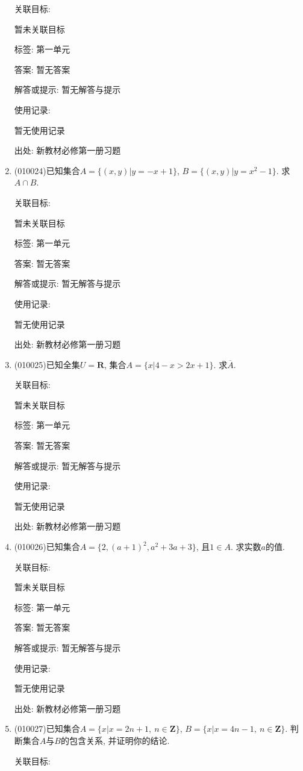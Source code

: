 \documentclass[10pt,a4paper]{article}
\begin{document}
\begin{enumerate}[1.]
关联目标:

暂未关联目标



标签: 第一单元

答案: 暂无答案

解答或提示: 暂无解答与提示

使用记录:

暂无使用记录


出处: 新教材必修第一册习题
\item { (010024)}已知集合$A=\{(x, y)|y=-x+1\}$, $B=\{(x, y)|y=x^2-1\}$. 求$A\cap B$.


关联目标:

暂未关联目标



标签: 第一单元

答案: 暂无答案

解答或提示: 暂无解答与提示

使用记录:

暂无使用记录


出处: 新教材必修第一册习题
\item { (010025)}已知全集$U=\mathbf{R}$, 集合$A=\{x|4-x>2x+1\}$. 求$\overline A$.


关联目标:

暂未关联目标



标签: 第一单元

答案: 暂无答案

解答或提示: 暂无解答与提示

使用记录:

暂无使用记录


出处: 新教材必修第一册习题
\item { (010026)}已知集合$A=\{2, (a+1)^2, a^2+3a+3\}$, 且$1\in A$. 求实数$a$的值.


关联目标:

暂未关联目标



标签: 第一单元

答案: 暂无答案

解答或提示: 暂无解答与提示

使用记录:

暂无使用记录


出处: 新教材必修第一册习题
\item { (010027)}已知集合$A=\{x|x=2n+1,\ n\in \mathbf{Z}\}$, $B=\{x|x=4n-1,\ n\in \mathbf{Z}\}$. 判断集合$A$与$B$的包含关系, 并证明你的结论.


关联目标:


\end{enumerate}
\end{document}
